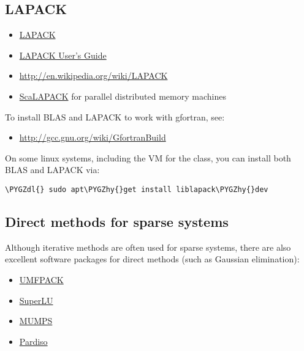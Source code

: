 \documentclass[letterpaper,10pt,english]{sphinxmanual}
\def\PYGZdl{\char`\$}
\def\PYGZhy{\char`\-}
\begin{document}
\subsection{LAPACK}
\label{linalg:lapack}\label{linalg:linalg-lapack}\begin{itemize}
\item {} 
\href{http://www.netlib.org/lapack/}{LAPACK}

\item {} 
\href{http://www.netlib.org/lapack/lug/}{LAPACK User's Guide}

\item {} 
\url{http://en.wikipedia.org/wiki/LAPACK}

\item {} 
\href{http://www.netlib.org/scalapack/}{ScaLAPACK} for parallel distributed memory
machines

\end{itemize}

To install BLAS and LAPACK to work with gfortran, see:
\begin{itemize}
\item {} 
\url{http://gcc.gnu.org/wiki/GfortranBuild}

\end{itemize}

On some linux systems, including the VM for the class, you can install both
BLAS and LAPACK via:

\begin{Verbatim}[commandchars=\\\{\}]
\PYGZdl{} sudo apt\PYGZhy{}get install liblapack\PYGZhy{}dev
\end{Verbatim}


\subsection{Direct methods for sparse systems}
\label{linalg:direct-methods-for-sparse-systems}\label{linalg:linalg-spdirect}
Although iterative methods are often used for sparse systems, there are also
excellent software packages for direct methods (such as Gaussian
elimination):
\begin{itemize}
\item {} 
\href{http://www.cise.ufl.edu/research/sparse/umfpack/}{UMFPACK}

\item {} 
\href{http://crd-legacy.lbl.gov/~xiaoye/SuperLU/}{SuperLU}

\item {} 
\href{http://graal.ens-lyon.fr/MUMPS/}{MUMPS}

\item {} 
\href{http://www.pardiso-project.org/}{Pardiso}

\end{itemize}
\end{document}
